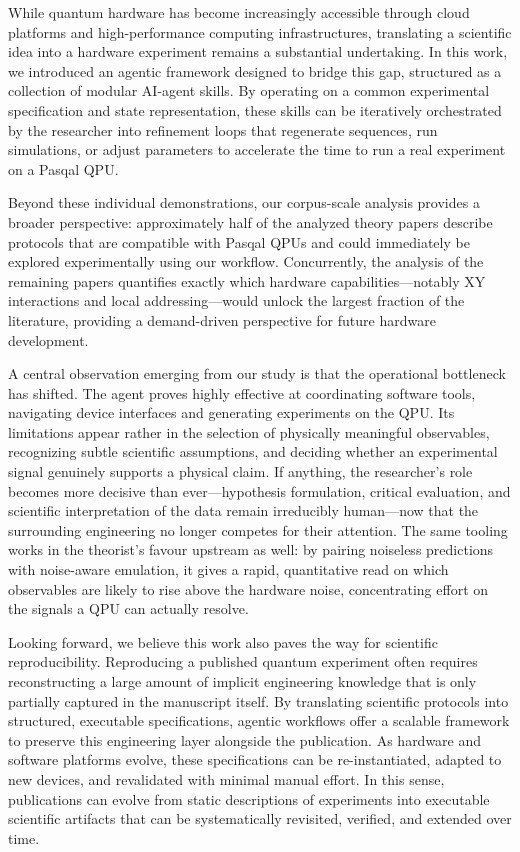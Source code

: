 \documentclass[aps,pra,reprint,amssymb,superscriptaddress,nofootinbib,floatfix]{revtex4-2}
\begin{document}
While quantum hardware has become increasingly accessible through cloud platforms and high-performance computing infrastructures, translating a scientific idea into a hardware experiment remains a substantial undertaking. In this work, we introduced an agentic framework designed to bridge this gap, structured as a collection of modular AI-agent skills. By operating on a common experimental specification and state representation, these skills can be iteratively orchestrated by the researcher into refinement loops that regenerate sequences, run simulations, or adjust parameters to accelerate the time to run a real experiment on a Pasqal QPU.

Beyond these individual demonstrations, our corpus-scale analysis provides a broader perspective: approximately half of the analyzed theory papers describe protocols that are compatible with Pasqal QPUs and could immediately be explored experimentally using our workflow. Concurrently, the analysis of the remaining papers quantifies exactly which hardware capabilities—notably XY interactions and local addressing—would unlock the largest fraction of the literature, providing a demand-driven perspective for future hardware development.

A central observation emerging from our study is that the operational bottleneck has shifted. The agent proves highly effective at coordinating software tools, navigating device interfaces and generating experiments on the QPU. Its limitations appear rather in the selection of physically meaningful observables, recognizing subtle scientific assumptions, and deciding whether an experimental signal genuinely supports a physical claim. If anything, the researcher's role becomes more decisive than ever---hypothesis formulation, critical evaluation, and scientific interpretation of the data remain irreducibly human---now that the surrounding engineering no longer competes for their attention. The same tooling works in the theorist's favour upstream as well: by pairing noiseless predictions with noise-aware emulation, it gives a rapid, quantitative read on which observables are likely to rise above the hardware noise, concentrating effort on the signals a QPU can actually resolve.

Looking forward, we believe this work also paves the way for scientific reproducibility. Reproducing a published quantum experiment often requires reconstructing a large amount of implicit engineering knowledge that is only partially captured in the manuscript itself. By translating scientific protocols into structured, executable specifications, agentic workflows offer a scalable framework to preserve this engineering layer alongside the publication. As hardware and software platforms evolve, these specifications can be re-instantiated, adapted to new devices, and revalidated with minimal manual effort. In this sense, publications can evolve from static descriptions of experiments into executable scientific artifacts that can be systematically revisited, verified, and extended over time.
\end{document}
